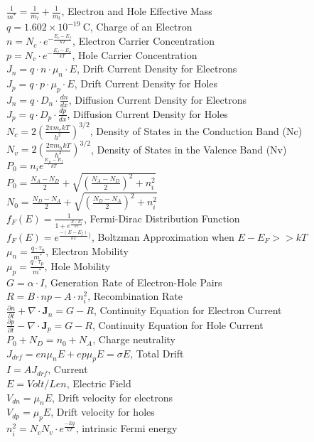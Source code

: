 \documentclass[10pt,landscape]{article}
\begin{document}
\begin{multicols}{3}
$\frac{1}{m^*} = \frac{1}{m_l} + \frac{1}{m_t}$, Electron and Hole Effective Mass\\
$q = 1.602 \times 10^{-19}\ \mathrm{C}$, Charge of an Electron\\
$n = N_c \cdot e^{-\frac{E_c - E_f}{kT}}$, Electron Carrier Concentration\\
$p = N_v \cdot e^{-\frac{E_f - E_v}{kT}}$, Hole Carrier Concentration\\
$J_n = q \cdot n \cdot \mu_n \cdot E$, Drift Current Density for Electrons\\
$J_p = q \cdot p \cdot \mu_p \cdot E$, Drift Current Density for Holes\\
$J_n = q \cdot D_n \cdot \frac{dn}{dx}$, Diffusion Current Density for Electrons\\
$J_p = q \cdot D_p \cdot \frac{dp}{dx}$, Diffusion Current Density for Holes\\
$N_c = 2 \left(\frac{2\pi m_e kT}{h^2}\right)^{3/2}$, Density of States in the Conduction Band (Nc)\\
$N_v = 2 \left(\frac{2\pi m_h kT}{h^2}\right)^{3/2}$, Density of States in the Valence Band (Nv)\\
$P_0 = n_i e^{\frac{E_{fi} - E_f}{kT}}$\\
$P_0 = \frac{N_A - N_D}{2} + \sqrt{(\frac{N_A - N_D}{2})^2 + n_i^2}$\\
$N_0 = \frac{N_D - N_A}{2} + \sqrt{(\frac{N_D - N_A}{2})^2 + n_i^2}$\\
$f_F(E) = \frac{1}{1 + e^{\frac{E - E_f}{kT}}}$, Fermi-Dirac Distribution Function\\
$f_F(E) = e^{\frac{-(E - E_f)}{kT})}$, Boltzman Approximation when $E-E_F >> kT$\\
$\mu_n = \frac{q \cdot \tau_n}{m^*}$, Electron Mobility\\
$\mu_p = \frac{q \cdot \tau_p}{m^*}$, Hole Mobility\\
$G = \alpha \cdot I$, Generation Rate of Electron-Hole Pairs\\
$R = B \cdot np - A \cdot n_i^2$, Recombination Rate\\
$\frac{\partial n}{\partial t} + \nabla \cdot \mathbf{J}_n = G - R$, Continuity Equation for Electron Current\\
$\frac{\partial p}{\partial t} - \nabla \cdot \mathbf{J}_p = G - R$, Continuity Equation for Hole Current\\
$P_0+N_D=n_0+N_A$, Charge neutrality\\
$J_{drf} = e n \mu_n E + e p \mu_p E = \sigma E$, Total Drift\\
$I = A J_{drf}$, Current\\
$E = Volt/Len$, Electric Field\\
$V_{dn} = \mu_nE$, Drift velocity for electrons\\
$V_{dp} = \mu_pE$, Drift velocity for holes\\
$n_i^2 = N_c N_v \cdot e^{\frac{-Eg}{kT}}$, intrinsic Fermi energy\\




\end{multicols}
\end{document}

